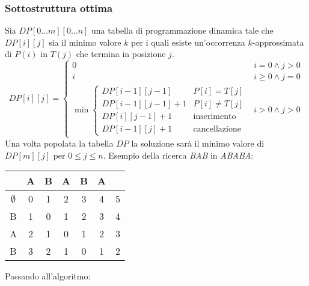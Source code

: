         \subsubsection{Sottostruttura ottima}
            Sia $DP[0\dots m][0\dots n]$ una tabella di programmazione dinamica tale che $DP[i][j]$ sia il minimo valore $k$ per i quali esiste un'occorrenza $k$-approssimata di $P(i)$ in $T(j)$ che termina in posizione $j$.
            $$
                DP[i][j]=\begin{cases}
                    0 & i=0\land j>0\\
                    i & i\geq0\land j=0\\
                    \min\begin{cases}
                        DP[i-1][j-1] & P[i]=T[j]\\
                        DP[i-1][j-1]+1 & P[i]\neq T[j]\\
                        DP[i][j-1]+1 & \text{inserimento}\\
                        DP[i-1][j]+1 & \text{cancellazione}
                    \end{cases} & i>0\land j>0
                \end{cases}
            $$
            Una volta popolata la tabella $DP$ la soluzione sarà il minimo valore di $DP[m][j]$ per $0\leq j\leq n$. Esempio della ricerca \textit{BAB} in \textit{ABABA}:
            \begin{table}[H]
                \centering
                \begin{tabular}{c |c c c c c c}
                    & A & B & A & B & A & \\
                    \hline
                    $\emptyset$ & 0 & 1 & 2 & 3 & 4 & 5 \\
                    B & 1 & 0 & 1 & 2 & 3 & 4 \\
                    A & 2 & 1 & 0 & 1 & 2 & 3 \\
                    B & 3 & 2 & 1 & 0 & 1 & 2
                \end{tabular}
            \end{table}
            Passando all'algoritmo:
